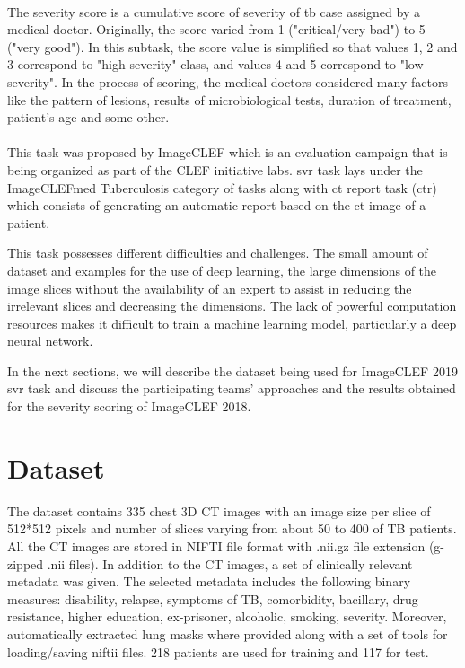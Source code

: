 \paragraph{}
The severity score is a cumulative score of severity of \acs{tb} case assigned by a medical doctor. Originally, the score varied from 1 ("critical/very bad") to 5 ("very good"). In this subtask, the score value is simplified so that values 1, 2 and 3 correspond to "high severity" class, and values 4 and 5 correspond to "low severity". In the process of scoring, the medical doctors considered many factors like the pattern of lesions, results of microbiological tests, duration of treatment, patient's age and some other.
\paragraph{}
This task was proposed by ImageCLEF which is an evaluation campaign that is being organized as part of the CLEF initiative labs. \acs{svr} task lays under the ImageCLEFmed Tuberculosis category of tasks along with \acs{ct} report task (\acs{ctr}) which consists of generating an automatic report based on the \acs{ct} image of a patient.

This task possesses different difficulties and challenges. The small amount of dataset and examples for the use of deep learning, the large dimensions of the image slices without the availability of an expert to assist in reducing the irrelevant slices and decreasing the dimensions. The lack of powerful computation resources makes it difficult to train a machine learning model, particularly a deep neural network.

In the next sections, we will describe the dataset being used for ImageCLEF 2019 \acs{svr} task and discuss the participating teams' approaches and the results obtained for the severity scoring of ImageCLEF 2018.

\section{Dataset}
The dataset contains 335 chest 3D CT images with an image size per slice of 512*512 pixels and number of slices varying from about 50 to 400 of TB patients. All the CT images are stored in NIFTI file format with .nii.gz file extension (g-zipped .nii files). In addition to the CT images, a set of clinically relevant metadata was given. The selected metadata includes the following binary measures: disability, relapse, symptoms of TB, comorbidity, bacillary, drug resistance, higher education, ex-prisoner, alcoholic, smoking, severity. Moreover, automatically extracted lung masks where provided along with a set of tools for loading/saving niftii files. 218 patients are used for training and 117 for test.
